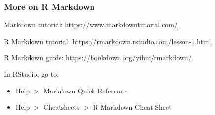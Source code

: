 \documentclass{beamer}
\begin{document}
	\begin{frame}
		\frametitle{More on R Markdown}

		Markdown tutorial: \href{https://www.markdowntutorial.com/}{https://www.markdowntutorial.com/}

		\vspace{1em}
		
		R Markdown tutorial: \href{https://rmarkdown.rstudio.com/lesson-1.html}{https://rmarkdown.rstudio.com/lesson-1.html}

		\vspace{1em}

		R Markdown guide: \href{https://bookdown.org/yihui/rmarkdown/}{https://bookdown.org/yihui/rmarkdown/}

		\vspace{1em}

		In RStudio, go to:
		\begin{itemize}
			\item Help $>$ Markdown Quick Reference
			\item Help $>$ Cheatsheets $>$ R Markdown Cheat Sheet
		\end{itemize}

	\end{frame}
\end{document}

